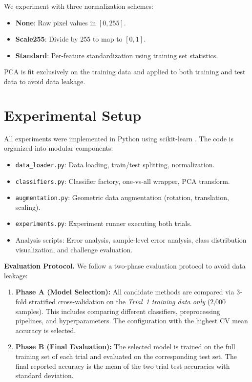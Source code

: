 \documentclass[11pt,a4paper,twocolumn]{article}
\begin{document}
We experiment with three normalization schemes:
\begin{itemize}[noitemsep]
    \item \textbf{None}: Raw pixel values in $[0, 255]$.
    \item \textbf{Scale255}: Divide by 255 to map to $[0, 1]$.
    \item \textbf{Standard}: Per-feature standardization using training set statistics.
\end{itemize}
PCA is fit exclusively on the training data and applied to both training and test data to avoid data leakage.

\section{Experimental Setup}

All experiments were implemented in Python using scikit-learn \cite{pedregosa2011scikit}. The code is organized into modular components:
\begin{itemize}[noitemsep]
    \item \texttt{data\_loader.py}: Data loading, train/test splitting, normalization.
    \item \texttt{classifiers.py}: Classifier factory, one-vs-all wrapper, PCA transform.
    \item \texttt{augmentation.py}: Geometric data augmentation (rotation, translation, scaling).
    \item \texttt{experiments.py}: Experiment runner executing both trials.
    \item Analysis scripts: Error analysis, sample-level error analysis, class distribution visualization, and challenge evaluation.
\end{itemize}

\textbf{Evaluation Protocol.} We follow a two-phase evaluation protocol to avoid data leakage:
\begin{enumerate}[noitemsep]
    \item \textbf{Phase A (Model Selection):} All candidate methods are compared via 3-fold stratified cross-validation on the \emph{Trial~1 training data only} (2,000 samples). This includes comparing different classifiers, preprocessing pipelines, and hyperparameters. The configuration with the highest CV mean accuracy is selected.
    \item \textbf{Phase B (Final Evaluation):} The selected model is trained on the full training set of each trial and evaluated on the corresponding test set. The final reported accuracy is the mean of the two trial test accuracies with standard deviation.
\end{enumerate}
\end{document}
